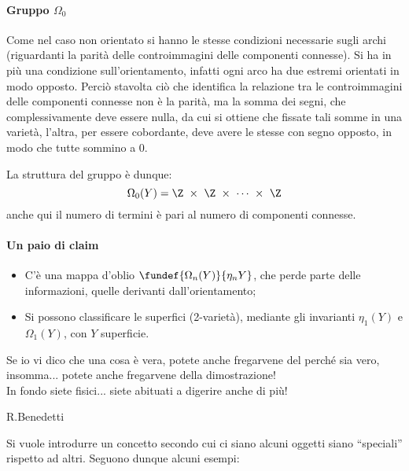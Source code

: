 \paragraph{Gruppo $\Omega_0$}
Come nel caso non orientato si hanno le stesse condizioni necessarie sugli archi (riguardanti la parità delle controimmagini delle componenti connesse). Si ha in più una condizione sull'orientamento, infatti ogni arco ha due estremi orientati in modo opposto.
Perciò stavolta ciò che identifica la relazione tra le controimmagini delle componenti connesse non è la parità, ma la somma dei segni, che complessivamente deve essere nulla, da cui si ottiene che fissate tali somme in una varietà, l'altra, per essere cobordante, deve avere le stesse con segno opposto, in modo che tutte sommino a 0.

La struttura del gruppo è dunque: 
\begin{equation*}
\Omega_0(Y) = \Z~\times~\Z~\times~\cdots~\times~\Z
\end{equation*}
anche qui il numero di termini è pari al numero di componenti connesse.


\paragraph{Un paio di claim}
\begin{itemize}
\item C'è una mappa d'oblio $\fundef{\Omega_n(Y)}{\eta_n{Y}}$, che perde parte delle informazioni, quelle derivanti dall'orientamento;
\item Si possono classificare le superfici (2-varietà), mediante gli invarianti $\eta_1(Y)$ e $\Omega_1(Y)$, con $Y$ superficie.
\end{itemize}


\epigraph{Se io vi dico che una cosa è vera, potete anche fregarvene del perché sia vero, insomma... potete anche fregarvene della dimostrazione!\\ In fondo siete fisici... siete abituati a digerire anche di più!}{R.Benedetti}

Si vuole introdurre un concetto secondo cui ci siano alcuni oggetti siano ``speciali'' rispetto ad altri. Seguono dunque alcuni esempi:

